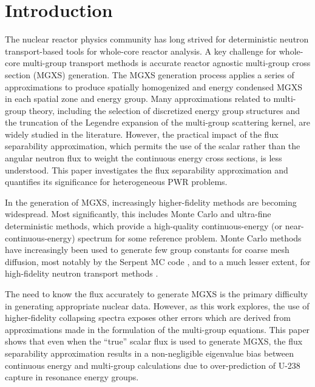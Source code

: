 \section{Introduction}
\label{sec:intro}

The nuclear reactor physics community has long strived for deterministic neutron transport-based tools for whole-core reactor analysis. A key challenge for whole-core multi-group transport methods is accurate reactor agnostic multi-group cross section (MGXS) generation. The MGXS generation process applies a series of approximations to produce spatially homogenized and energy condensed MGXS in each spatial zone and energy group. Many approximations related to multi-group theory, including the selection of discretized energy group structures and the truncation of the Legendre expansion of the multi-group scattering kernel, are widely studied in the literature. However, the practical impact of the flux separability approximation, which permits the use of the scalar rather than the angular neutron flux to weight the continuous energy cross sections, is less understood. This paper investigates the flux separability approximation and quantifies its significance for heterogeneous PWR problems.

In the generation of MGXS, increasingly higher-fidelity methods are becoming widespread.  Most significantly, this includes Monte Carlo and ultra-fine deterministic methods, which provide a high-quality continuous-energy (or near-continuous-energy) spectrum for some reference problem.  Monte Carlo methods have increasingly been used to generate few group constants for coarse mesh diffusion, most notably by the Serpent MC code \citep{serpent2013manual}, and to a much lesser extent, for high-fidelity neutron transport methods \citep{redmond1997multigroup, nelson2014improved, cai2014condensation, boyd2016thesis}.

The need to know the flux accurately to generate MGXS is the primary difficulty in generating appropriate nuclear data.  However, as this work explores, the use of higher-fidelity collapsing spectra exposes other errors which are derived from approximations made in the formulation of the multi-group equations. This paper shows that even when the ``true'' scalar flux is used to generate MGXS, the flux separability approximation results in a non-negligible eigenvalue bias between continuous energy and multi-group calculations due to over-prediction of U-238 capture in resonance energy groups.

